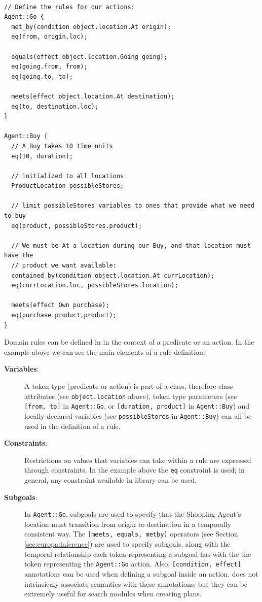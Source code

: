 \begin{verbatim}

// Define the rules for our actions:
Agent::Go {
  met_by(condition object.location.At origin);
  eq(from, origin.loc);
 
  equals(effect object.location.Going going);
  eq(going.from, from);
  eq(going.to, to);
   
  meets(effect object.location.At destination);
  eq(to, destination.loc);
}

Agent::Buy {
  // A Buy takes 10 time units
  eq(10, duration);

  // initialized to all locations
  ProductLocation possibleStores;

  // limit possibleStores variables to ones that provide what we need to buy
  eq(product, possibleStores.product);

  // We must be At a location during our Buy, and that location must have the
  // product we want available:
  contained_by(condition object.location.At currLocation);
  eq(currLocation.loc, possibleStores.location);
  
  meets(effect Own purchase);
  eq(purchase.product,product);
}
\end{verbatim}

Domain rules can be defined in \nd in the context of a predicate or an
action. In the example above we can see the main elements of a rule
definition:

\begin{description}

\item[\textbf{Variables}:] A token type (predicate or action) is part
  of a class, therefore class attributes (see \texttt{object.location}
  above), token type parameters (see \texttt{[from, to]} in
  \texttt{Agent::Go}, or \texttt{[duration, product]} in
  \texttt{Agent::Buy}) and locally declared variables (see
  \texttt{possibleStores} in \texttt{Agent::Buy}) can all be used in
  the definition of a rule.

\item[\textbf{Constraints}:] Restrictions on values that variables can
  take within a rule are expressed through constraints. In the example
  above the \texttt{eq} constraint is used; in general, any constraint
  available in \eus library can be used.

\item[\textbf{Subgoals}:] In \texttt{Agent::Go}, subgoals are used to
  specify that the Shopping Agent's location must transition from
  origin to destination in a temporally consistent way. The
  \texttt{[meets, equals, metby]} operators (see Section
  \ref{sec:europa:inference}) are used to specify subgoals, along with
  the temporal relationship each token representing a subgoal has with
  the the token representing the \texttt{Agent::Go} action. Also,
  \texttt{[condition, effect]} annotations can be used when defining a
  subgoal inside an action. \eu does not intrinsicaly associate semantics
  with these annotations; but they can be extremely useful for search
  modules when creating plans.

\end{description}

